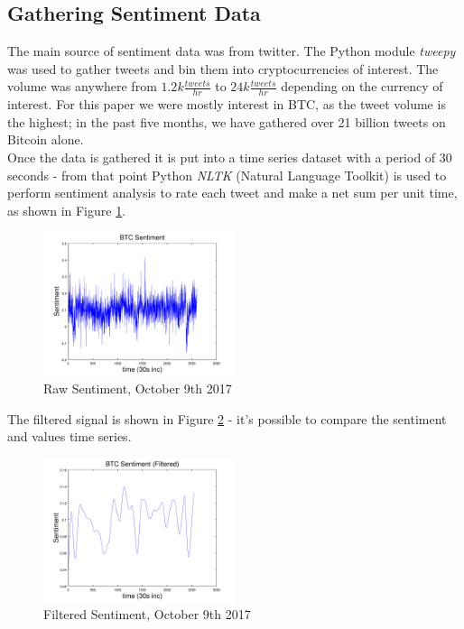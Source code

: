 \documentclass[12pt,journal,compsoc]{IEEEtran}
\begin{document}
\subsection{Gathering Sentiment Data}
The main source of sentiment data was from twitter. The Python module \textit{tweepy} \cite{Tweepy} was used to gather
tweets and bin them into cryptocurrencies of interest. The volume was anywhere from $1.2k \frac{tweets}{hr}$
to $24k \frac{tweets}{hr}$ depending on the currency of interest. For this paper we were mostly interest in BTC, as the
tweet volume is the highest; in the past five months, we have gathered over 21 billion tweets on Bitcoin alone.\\

Once the data is gathered it is put into a time series dataset with a period of 30 seconds - from that point Python \textit{NLTK} 
(Natural Language Toolkit) \cite{NLTK} is used to perform sentiment analysis to rate each tweet and make a net sum per unit time,
as shown in Figure \ref{fig:RawSent}. 

\begin{figure}[hp]
	\centering
	\includegraphics[width=0.5\textwidth]{../Datasets/Plots/Oct9_Sen}
	\caption{Raw Sentiment, October 9th 2017}
	\label{fig:RawSent}
\end{figure}

The filtered signal is shown in Figure \ref{fig:FilteredSent} - it's possible to compare the sentiment and values time series.

\begin{figure}[h]
	\centering
	\includegraphics[width=0.5\textwidth]{../Datasets/Plots/Oct9_Sen_Fil}
	\caption{Filtered Sentiment, October 9th 2017}
	\label{fig:FilteredSent}
\end{figure}
\end{document}
